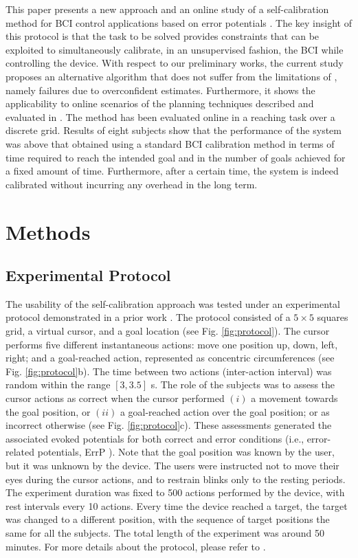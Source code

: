 \documentclass[10pt,letterpaper]{article}
\begin{document}
This paper presents a new approach and an online study of a self-calibration method for BCI control applications based on error potentials \cite{chavarriaga2010learning, iturrate13}. The key insight of this protocol is that the task to be solved provides constraints that can be exploited to simultaneously calibrate, in an unsupervised fashion, the BCI while controlling the device. With respect to our preliminary works, the current study proposes an alternative algorithm that does not suffer from the limitations of \cite{grizou2014calibration}, namely failures due to overconfident estimates. Furthermore, it shows the applicability to online scenarios of the planning techniques described and evaluated in \cite{grizou2014interactive}. 
%
The method has been evaluated online in a reaching task over a discrete grid. Results of eight subjects show that the performance of the system was above that obtained using a standard BCI calibration method in terms of time required to reach the intended goal and in the number of goals achieved for a fixed amount of time. Furthermore, after a certain time, the system is indeed calibrated without incurring any overhead in the long term.

\section{Methods}
\label{sec:methods}

\subsection{Experimental Protocol}

The usability of the self-calibration approach was tested under an experimental protocol demonstrated in a prior work \cite{iturrate13}. The protocol consisted of a $5\times5$ squares grid, a virtual cursor, and a goal location (see Fig. \ref{fig:protocol}). The cursor performs five different instantaneous actions: move one position up, down, left, right; and a goal-reached action, represented as concentric circumferences (see Fig. \ref{fig:protocol}b). The time between two actions (inter-action interval) was random within the range $[3, 3.5]$ s. The role of the subjects was to assess the cursor actions as correct when the cursor performed $(i)$ a movement towards the goal position, or $(ii)$ a goal-reached action over the goal position; or as incorrect otherwise (see Fig. \ref{fig:protocol}c). These assessments generated the associated evoked potentials for both correct and error conditions (i.e., error-related potentials, ErrP \cite{chavarriaga2014errare}). Note that the goal position was known by the user, but it was unknown by the device. The users were instructed not to move their eyes during the cursor actions, and to restrain blinks only to the resting periods. The experiment duration was fixed to 500 actions performed by the device, with rest intervals every 10 actions. Every time the device reached a target, the target was changed to a different position, with the sequence of target positions the same for all the subjects. The total length of the experiment was around 50 minutes. For more details about the protocol, please refer to \cite{iturrate13}.
\end{document}
